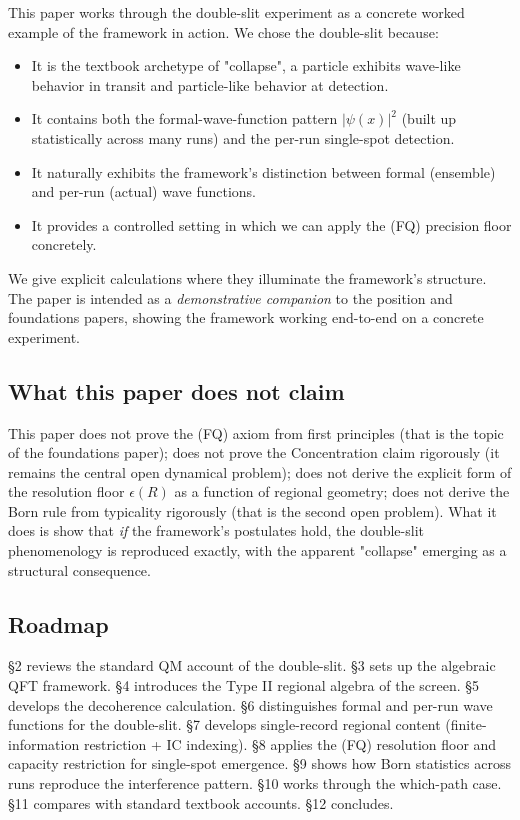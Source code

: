 \documentclass[11pt,a4paper]{article}
\begin{document}
This paper works through the double-slit experiment as a concrete worked example of the framework in action. We chose the double-slit because:

\begin{itemize}
  \item It is the textbook archetype of "collapse", a particle exhibits wave-like behavior in transit and particle-like behavior at detection.
  \item It contains both the formal-wave-function pattern $|\psi(x)|^2$ (built up statistically across many runs) and the per-run single-spot detection.
  \item It naturally exhibits the framework's distinction between formal (ensemble) and per-run (actual) wave functions.
  \item It provides a controlled setting in which we can apply the (FQ) precision floor concretely.
\end{itemize}

We give explicit calculations where they illuminate the framework's structure. The paper is intended as a \emph{demonstrative companion} to the position and foundations papers, showing the framework working end-to-end on a concrete experiment.

\subsection{What this paper does not claim}

This paper does not prove the (FQ) axiom from first principles (that is the topic of the foundations paper); does not prove the Concentration claim rigorously (it remains the central open dynamical problem); does not derive the explicit form of the resolution floor $\epsilon(R)$ as a function of regional geometry; does not derive the Born rule from typicality rigorously (that is the second open problem). What it does is show that \emph{if} the framework's postulates hold, the double-slit phenomenology is reproduced exactly, with the apparent "collapse" emerging as a structural consequence.

\subsection{Roadmap}

§2 reviews the standard QM account of the double-slit. §3 sets up the algebraic QFT framework. §4 introduces the Type II regional algebra of the screen. §5 develops the decoherence calculation. §6 distinguishes formal and per-run wave functions for the double-slit. §7 develops single-record regional content (finite-information restriction + IC indexing). §8 applies the (FQ) resolution floor and capacity restriction for single-spot emergence. §9 shows how Born statistics across runs reproduce the interference pattern. §10 works through the which-path case. §11 compares with standard textbook accounts. §12 concludes.
\end{document}
